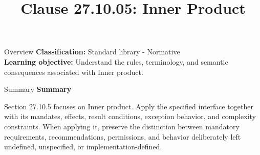 \documentclass[10pt,letterpaper]{article}
\title{Clause 27.10.05: Inner Product}
\author{}
\date{}
\begin{document}
\maketitle
\begin{CornellOverviewBox}{Overview}
\textbf{Classification:} Standard library - Normative\\[2pt]
\textbf{Learning objective:} Understand the rules, terminology, and semantic consequences associated with Inner product.
\end{CornellOverviewBox}\begin{CornellSummaryBox}{Summary}
{\sffamily\bfseries\color{Accent} Summary}\par\vspace{3pt}Section 27.10.5 focuses on Inner product. Apply the specified interface together with its mandates, effects, result conditions, exception behavior, and complexity constraints. When applying it, preserve the distinction between mandatory requirements, recommendations, permissions, and behavior deliberately left undefined, unspecified, or implementation-defined.
\end{CornellSummaryBox}
\end{document}
